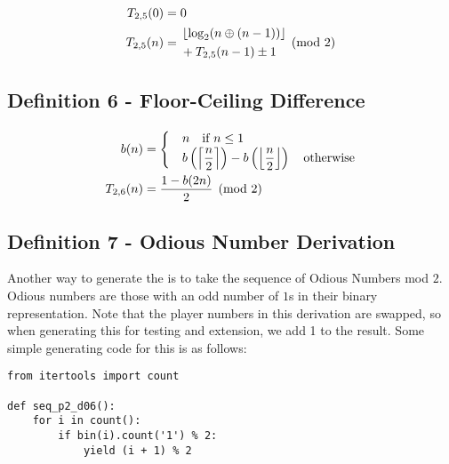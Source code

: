 \documentclass[conference]{IEEEtran}
\begin{document}
\begin{equation}
    \label{eq:p2d05}
    \begin{aligned}
T_{2,5}(0) &= 0 \\
T_{2,5}(n) &= \begin{aligned}[c]
    &\floor{\log_2(n \oplus (n - 1))} \\
    &+ T_{2,5}(n - 1) \pm 1
\end{aligned} \pmod{2}
    \end{aligned}
\end{equation}

\subsection{Definition 6 - Floor-Ceiling Difference}


\begin{equation}
    \begin{aligned}
      b(n) &= \begin{cases}
          &n \quad \text{if } n \le 1 \\
          &b\left(\left\lceil \dfrac{n}{2} \right\rceil\right) - b\left(\left\lfloor \dfrac{n}{2} \right\rfloor\right) \quad \text{otherwise}
\end{cases} \\
T_{2,6}(n) &= \dfrac{1 - b(2n)}{2} \pmod{2}
    \end{aligned}
\end{equation}


\subsection{Definition 7 - Odious Number Derivation}


Another way to generate the \TMS is to take the sequence of Odious Numbers \cite{OEIS-Odious} mod $2$. Odious numbers are those with an odd number of $1$s in their binary representation. Note that the player numbers in this derivation are swapped, so when generating this for testing and extension, we add 1 to the result. Some simple generating code for this is as follows:

\begin{lstlisting}[style=pythonstyle]
from itertools import count

def seq_p2_d06():
    for i in count():
        if bin(i).count('1') % 2:
            yield (i + 1) % 2
\end{lstlisting}
\end{document}
